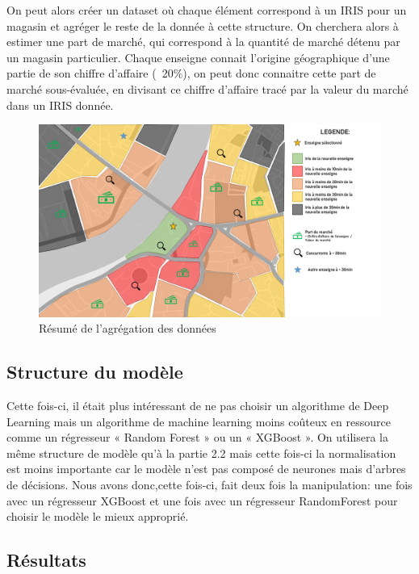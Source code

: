 On peut alors créer un dataset où chaque élément correspond à un IRIS pour un magasin et agréger le reste de la donnée à cette structure. On cherchera alors à estimer une part de marché, qui correspond à la quantité de marché détenu par un magasin particulier. Chaque enseigne connait l'origine géographique d'une partie de son chiffre d'affaire (~20\%), on peut donc connaitre cette part de marché sous-évaluée, en divisant ce chiffre d'affaire tracé par la valeur du marché dans un IRIS donnée.

\begin{figure}[H]
    \centering
    \includegraphics[width=\linewidth]{images/graphs/data_ca.png}
    \captionsetup{justification=centering}
    \caption{Résumé de l'agrégation des données}
    \label{fig:data_ca}
\end{figure}

\subsection{Structure du modèle}

Cette fois-ci, il était plus intéressant de ne pas choisir un algorithme de Deep Learning mais un algorithme de machine learning moins coûteux en ressource comme un régresseur « Random Forest » ou un « XGBoost ».
On utilisera la même structure de modèle qu’à la partie 2.2 mais cette fois-ci la normalisation est moins importante car le modèle n’est pas composé de neurones mais d’arbres de décisions.
Nous avons donc,cette fois-ci, fait deux fois la manipulation: une fois avec un régresseur XGBoost et une fois avec  un régresseur RandomForest pour choisir le modèle le mieux approprié.


\subsection{Résultats}

